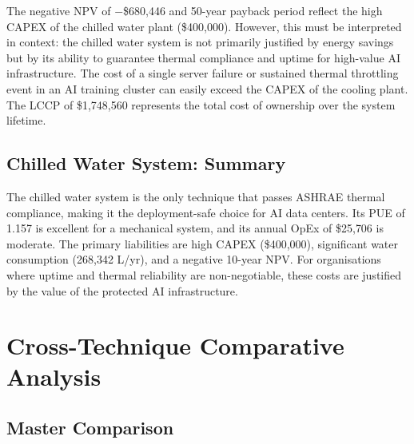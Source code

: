 ﻿\documentclass[12pt,a4paper]{report}
\begin{document}
The negative NPV of $-$\$680{,}446 and 50-year payback period reflect the high CAPEX of
the chilled water plant (\$400{,}000). However, this must be interpreted in context: the
chilled water system is not primarily justified by energy savings but by its ability to
guarantee thermal compliance and uptime for high-value AI infrastructure. The cost of a
single server failure or sustained thermal throttling event in an AI training cluster can
easily exceed the CAPEX of the cooling plant. The LCCP of \$1{,}748{,}560 represents the
total cost of ownership over the system lifetime.

\subsection{Chilled Water System: Summary}

The chilled water system is the only technique that passes ASHRAE thermal compliance,
making it the deployment-safe choice for AI data centers. Its PUE of 1.157 is excellent
for a mechanical system, and its annual OpEx of \$25{,}706 is moderate. The primary
liabilities are high CAPEX (\$400{,}000), significant water consumption (268{,}342 L/yr),
and a negative 10-year NPV. For organisations where uptime and thermal reliability are
non-negotiable, these costs are justified by the value of the protected AI infrastructure.

\section{Cross-Technique Comparative Analysis}
\label{sec:compare}

\subsection{Master Comparison}
\end{document}

